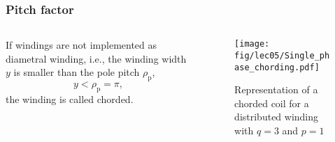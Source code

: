 \begin{frame}
	\frametitle{Pitch factor}
    \begin{columns}
		\begin{column}{0.6\textwidth}
	        If windings are not implemented as diametral winding, i.e., the winding width $y$ is smaller than the pole pitch $\rho_\mathrm{p}$, 
            $$y < \rho_\mathrm{p}=\pi,$$
            the winding is called chorded. 
        \end{column}
        \begin{column}{0.4\textwidth}
            \begin{figure}
                \centering
                \texttt{[image: fig/lec05/Single\_phase\_chording.pdf]}
                \caption{Representation of a chorded coil for a distributed winding with $q=3$ and $p=1$}
                \label{fig:Single_phase_chording}
            \end{figure}
        \end{column}
    \end{columns}
\end{frame}

